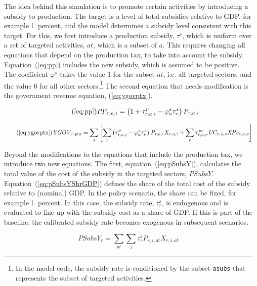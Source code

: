 \documentclass[11pt,letterpaper]{report}
\begin{document}
The idea behind this simulation is to promote certain activities
by introducing a subsidy to production. The target is a level
of total subsidies relative to GDP, for example 1~percent, and
the model determines a subsidy level consistent with this target.
For this, we first introduce a production subsidy, $\tau^s$, which
is uniform over a set of targeted activities, $\mathit{at}$, which
is a subset of $a$. This requires changing all equations that
depend on the production tax, to take into account the subsidy.
Equation~(\ref{eq:pp}) includes the new subsidy, which is assumed
to be positive. The coefficient $\varphi^s$ takes the value
1 for the subset $\mathit{at}$, i.e. all targeted sectors, and
the value 0 for all other sectors.\footnote{In the model
code, the subsidy rate is conditioned by the subset \texttt{asubs}
that represents the subset of targeted activities.}
The second equation that needs modification is the government
revenue equation, (\ref{eq:ygovptx}).

\begin{equation}
\label{eq:ppp}
\tag{\ref{eq:pp}}
\mathit{PP}_{r,a,i} =
   \left( 1 + \tau^p_{r,a,i} - \varphi^s_{a} \tau^s_{r} \right) \mathit{P}_{r,a,i}
\end{equation}

\begin{equation}
\label{eq:ygovptxp}
\tag{\ref{eq:ygovptx}}
\mathit{YGOV}_{r,ptx} =
   \sum_a{
      \left[
         \sum_i{
            \left( \tau^p_{r,a,i} - \varphi^s_{a} \tau^s_{r} \right) \mathit{P}_{r,a,i} \mathit{X_{r,a,i}}
         }
      +  \sum_v{
            \tau^\mathit{uc}_{r,a,v} \mathit{UC_{r,a,v}} \mathit{XPv_{r,a,v}}
         }
      \right]
   }
\end{equation}

Beyond the modifications to the equations that include the
production tax, we introduce two new equations.
The first, equation~(\ref{eq:pSubsY}), calculates the total
value of the cost of the subsidy in the targeted sectors, $\mathit{PSubsY}$.
Equation~(\ref{eq:pSubsYShrGDP}) defines the share of the total
cost of the subsidy relative to (nominal) GDP. In the policy
scenario, the share can be fixed, for example 1~percent. In this
case, the subsidy rate, $\tau^s_{r}$, is endogenous and is
evaluated to line
up with the subsidy cost as a share of GDP. If this is part of the
baseline, the calibrated subsidy rate becomes exogenous in
subsequent scenarios.

\begin{equation}
\label{eq:pSubsY}
\mathit{PSubsY}_r =
\sum_{\mathit{at}}
{\sum_i{\tau^s_{r} P_{r,i,\mathit{at}} X_{r,i,\mathit{at}} } }
\end{equation}
\end{document}

